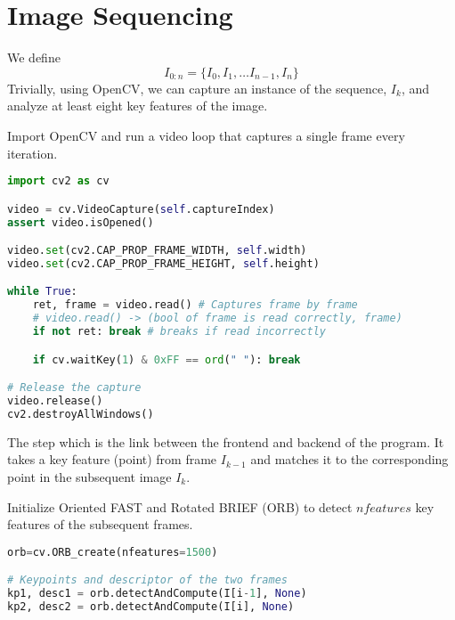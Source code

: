 \documentclass{article}
\begin{document}
\section{Image Sequencing}
\begin{tcolorbox}[enhanced,breakable, toggle left and right,sharp corners, colback=blue!5!white, colframe=blue!55!black, boxrule=0mm,top=0mm,bottom=0mm,leftrule=1mm, drop shadow=black!40!white, title=Step 1 ---  Capture Frame $I_k$]
We define $$I_{0:n} = \{I_0, I_1, \ldots I_{n-1}, I_n\}$$
Trivially, using OpenCV, we can capture an instance of the sequence, $I_k$, and analyze at least eight key features of the image.
\end{tcolorbox}
Import OpenCV and run a video loop that captures a single frame every iteration.
\begin{lstlisting}[language=python]
import cv2 as cv

video = cv.VideoCapture(self.captureIndex)
assert video.isOpened()

video.set(cv2.CAP_PROP_FRAME_WIDTH, self.width)
video.set(cv2.CAP_PROP_FRAME_HEIGHT, self.height)

while True: 
    ret, frame = video.read() # Captures frame by frame 
    # video.read() -> (bool of frame is read correctly, frame)
    if not ret: break # breaks if read incorrectly

    if cv.waitKey(1) & 0xFF == ord(" "): break

# Release the capture
video.release()
cv2.destroyAllWindows()
\end{lstlisting}


\vspace{0.5cm}
\begin{tcolorbox}[enhanced,breakable, toggle left and right,sharp corners, colback=blue!5!white, colframe=blue!55!black, boxrule=0mm,top=0mm,bottom=0mm,leftrule=1mm, drop shadow=black!40!white, title=Step 2 ---  Extract and match the feature between $I_{k-1}$ and its subsequent term $I_k$]
The step which is the link between the frontend and backend of the program. It takes a key feature (point) from frame $I_{k-1}$ and matches it to the corresponding point in the subsequent image $I_k$.
\end{tcolorbox}
Initialize Oriented FAST and Rotated BRIEF (ORB) to detect $nfeatures$ key features of the subsequent frames.
\begin{lstlisting}[language=python]
orb=cv.ORB_create(nfeatures=1500)

# Keypoints and descriptor of the two frames
kp1, desc1 = orb.detectAndCompute(I[i-1], None)
kp2, desc2 = orb.detectAndCompute(I[i], None)
\end{lstlisting}
\end{document}
